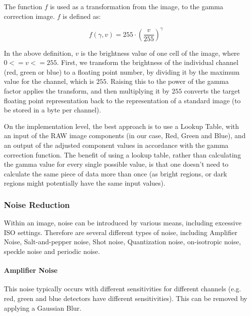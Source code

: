 \documentclass[10pt,a4paper]{article}
\begin{document}
The function $f$ is used as a transformation from the image, to the gamma correction image. $f$ is defined as:

$$f(\gamma, v) = 255 \cdot \left( \frac{v}{255}\right)^{\gamma} $$

In the above definition, $v$ is the brightness value of one cell of the image, where $0 <= v <= 255$. First, we transform the
brightness of the individual channel (red, green or blue) to a floating point number, by dividing it by the maximum value for
the channel, which is $255$. Raising this to the power of the gamma factor applies the transform, and then multiplying it by $255$ converts the
target floating point representation back to the representation of a standard image (to be stored in a byte per channel).

On the implementation level, the best approach is to use a Lookup Table, with an input of the RAW image components (in our case, Red, Green and Blue),
and an output of the adjusted component values in accordance with the gamma correction function. The benefit of using a lookup table, rather than calculating
the gamma value for every single possible value, is that one doesn't need to calculate the same piece of data more than once (as bright regions, or dark regions might
potentially have the same input values). 

\subsubsection{Noise Reduction}
Within an image, noise can be introduced by various means, including excessive ISO settings. Therefore are several different
types of noise, including Amplifier Noise, Salt-and-pepper noise, Shot noise, Quantization noise, on-isotropic noise, speckle noise
and periodic noise. 
\cite{NRandFiltering}



\paragraph{Amplifier Noise}
    This noise typically occurs with different sensitivities for different channels (e.g. red, green and blue detectors have
    different sensitivities). \cite{NRandFiltering}
    This can be removed by applying a Gaussian Blur. \cite{DigitalImageProcessingTextbook}
\end{document}

